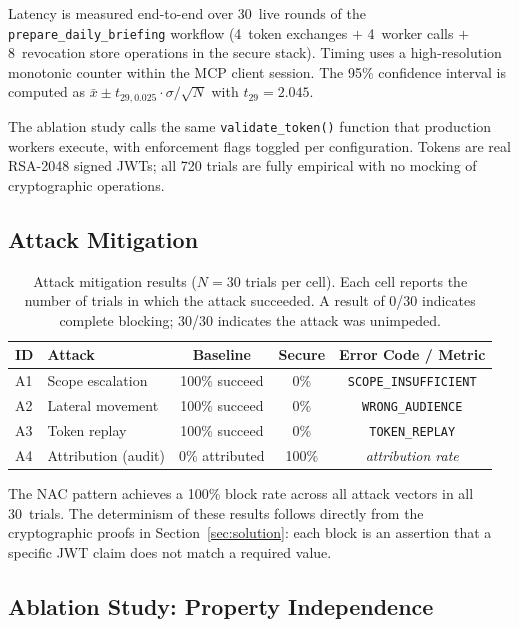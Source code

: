 \documentclass[journal]{IEEEtran}
\begin{document}
Latency is measured end-to-end over 30~live rounds of the
\texttt{prepare\_daily\_briefing} workflow (4~token exchanges $+$ 4~worker
calls $+$ 8~revocation store operations in the secure stack). Timing uses a
high-resolution monotonic counter within the MCP client session. The 95\%
confidence interval is computed as
$\bar{x} \pm t_{29,0.025} \cdot \sigma/\sqrt{N}$ with $t_{29} = 2.045$.

The ablation study calls the same \texttt{validate\_token()} function that
production workers execute, with enforcement flags toggled per configuration.
Tokens are real RSA-2048 signed JWTs; all 720 trials are fully empirical with
no mocking of cryptographic operations.

\subsection{Attack Mitigation}

\begin{table}[h]
\caption{Attack mitigation results ($N=30$ trials per cell). Each cell reports
the number of trials in which the attack succeeded. A result of 0/30 indicates
complete blocking; 30/30 indicates the attack was unimpeded.}
\label{tab:attacks}
\centering
\footnotesize
\setlength{\tabcolsep}{4pt}
\begin{tabular}{llccc}
\toprule
\textbf{ID} & \textbf{Attack} & \textbf{Baseline} & \textbf{Secure} & \textbf{Error Code / Metric} \\
\midrule
A1 & Scope escalation    & 100\% succeed & 0\%  & \texttt{SCOPE\_INSUFFICIENT} \\
A2 & Lateral movement    & 100\% succeed & 0\%  & \texttt{WRONG\_AUDIENCE} \\
A3 & Token replay        & 100\% succeed & 0\%  & \texttt{TOKEN\_REPLAY} \\
A4 & Attribution (audit) & 0\% attributed & 100\% & \textit{attribution rate} \\
\bottomrule
\end{tabular}
\end{table}

The NAC pattern achieves a 100\% block rate across all attack vectors in all
30~trials. The determinism of these results follows directly from the
cryptographic proofs in Section~\ref{sec:solution}: each block is an assertion
that a specific JWT claim does not match a required value.

\subsection{Ablation Study: Property Independence}
\label{sec:ablation}
\end{document}
